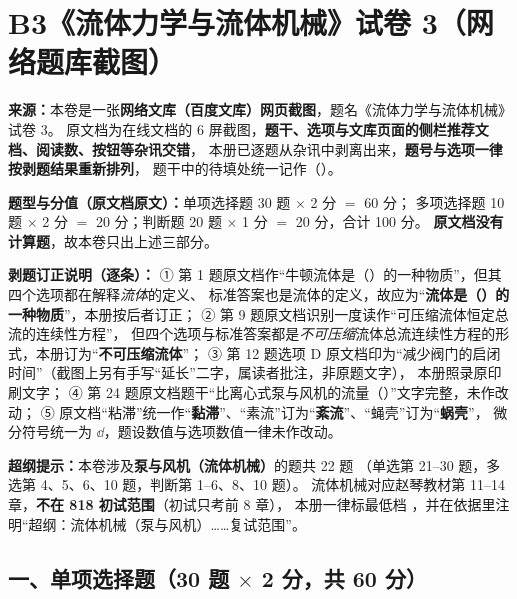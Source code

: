 \chapter*{B3\quad《流体力学与流体机械》试卷 3（网络题库截图）}

\begin{tishi}
\textbf{来源：}本卷是一张\textbf{网络文库（百度文库）网页截图}，题名《流体力学与流体机械》试卷 3。
原文档为在线文档的 6 屏截图，\textbf{题干、选项与文库页面的侧栏推荐文档、阅读数、按钮等杂讯交错}，
本册已逐题从杂讯中剥离出来，\textbf{题号与选项一律按剥题结果重新排列}，
题干中的待填处统一记作（\quad）。

\textbf{题型与分值（原文档原文）：}单项选择题 30 题 $\times$ 2 分 $=$ 60 分；
多项选择题 10 题 $\times$ 2 分 $=$ 20 分；判断题 20 题 $\times$ 1 分 $=$ 20 分，合计 100 分。
\textbf{原文档没有计算题}，故本卷只出上述三部分。

\textbf{剥题订正说明（逐条）：}
① 第 1 题原文档作“牛顿流体是（\quad）的一种物质”，但其四个选项都在解释\emph{流体}的定义、
标准答案也是流体的定义，故应为“\textbf{流体是（\quad）的一种物质}”，本册按后者订正；
② 第 9 题原文档识别一度读作“可压缩流体恒定总流的连续性方程”，
但四个选项与标准答案都是\emph{不可压缩}流体总流连续性方程的形式，本册订为“\textbf{不可压缩流体}”；
③ 第 12 题选项 D 原文档印为“减少阀门的启闭时间”（截图上另有手写“延长”二字，属读者批注，非原题文字），
本册照录原印刷文字；
④ 第 24 题原文档题干“比离心式泵与风机的流量（\quad）”文字完整，未作改动；
⑤ 原文档“粘滞”统一作“\textbf{黏滞}”、“素流”订为“\textbf{紊流}”、“蝇壳”订为“\textbf{蜗壳}”，
微分符号统一为 $\dd$，题设数值与选项数值一律未作改动。

\textbf{超纲提示：}本卷涉及\textbf{泵与风机（流体机械）}的题共 22 题
（单选第 21--30 题，多选第 4、5、6、10 题，判断第 1--6、8、10 题）。
流体机械对应赵琴教材第 11--14 章，\textbf{不在 818 初试范围}（初试只考前 8 章），
本册一律标最低档 ，并在依据里注明“超纲：流体机械（泵与风机）……复试范围”。
\end{tishi}

\section*{一、单项选择题（30 题 $\times$ 2 分，共 60 分）}


